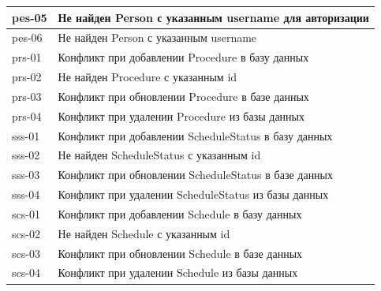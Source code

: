 \documentclass[a4paper,article]{article}
\begin{document}
\begin{sloppypar}
\begin{appendices}
\begin{xltabular}{\textwidth} { |
                >{\hsize} X |
                >{\hsize} X | }
            \hline
            pes-05
            & Не найден Person с указанным username для авторизации \\
            
            \hline
            pes-06
            & Не найден Person с указанным username \\
            
            \hline
            prs-01
            & Конфликт при добавлении Procedure в базу данных \\
            
            \hline
            prs-02
            & Не найден Procedure с указанным id \\
            
            \hline
            prs-03
            & Конфликт при обновлении Procedure в базе данных \\
            
            \hline
            prs-04
            & Конфликт при удалении Procedure из базы данных \\
            
            \hline
            sss-01
            & Конфликт при добавлении ScheduleStatus в базу данных \\
            
            \hline
            sss-02
            & Не найден ScheduleStatus с указанным id \\
            
            \hline
            sss-03
            & Конфликт при обновлении ScheduleStatus в базе данных \\
            
            \hline
            sss-04
            & Конфликт при удалении ScheduleStatus из базы данных \\
            
            \hline
            scs-01
            & Конфликт при добавлении Schedule в базу данных \\
            
            \hline
            scs-02
            & Не найден Schedule с указанным id \\
            
            \hline
            scs-03
            & Конфликт при обновлении Schedule в базе данных \\
            
            \hline
            scs-04
            & Конфликт при удалении Schedule из базы данных \\
            

\end{xltabular}
\end{appendices}
\end{sloppypar}
\end{document}
